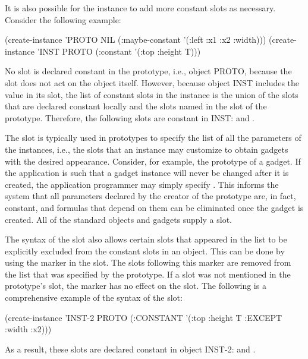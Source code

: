 It is also possible for the
instance to add more constant slots as necessary.  Consider the
following example:
\begin{programexample}
(create-instance 'PROTO NIL (:maybe-constant '(:left :x1 :x2 :width)))
(create-instance 'INST PROTO (:constant '(:top :height T)))
\end{programexample}
No slot is declared constant in the prototype, i.e., object PROTO,
because the  slot does not act on the object
itself.  However, because object INST includes the value \value{t} in its
 slot, the list of constant slots in the instance is the
union of the slots that are declared constant locally and the slots
named in the  slot of the prototype.  Therefore,
the following slots are constant in INST:  and .

The slot  is typically used in prototypes to
specify the list of all the parameters of the instances, i.e., the
slots that an instance may customize to obtain gadgets with the
desired appearance.  Consider, for example, the prototype of a gadget.
If the application is such that a gadget instance will never be
changed after it is created, the application programmer may simply
specify {\obeyspaces {}}.  This informs the system that all
parameters declared by the creator of the prototype are, in fact,
constant, and formulas that depend on them can be eliminated once the
gadget is created.  All of the standard objects and gadgets supply a
 slot.

The syntax of the  slot also allows certain slots that
appeared in the  list to be explicitly excluded from the
constant slots in an object.  This can be done by using the marker
 in the  slot.  The slots following this marker
are removed from the list that was specified by the prototype.  If a
slot was not mentioned in the prototype's  slot,
the  marker has no effect on the slot.  The following is a
comprehensive example of the syntax of the  slot:
\begin{programexample}
(create-instance 'INST-2 PROTO
   (:CONSTANT '(:top :height T :EXCEPT :width :x2)))
\end{programexample}

As a result, these slots are declared constant in object
INST-2:  and .


